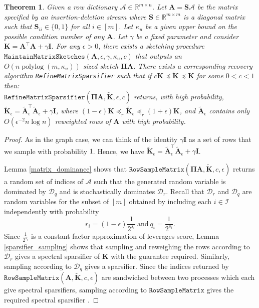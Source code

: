 \documentclass[11pt]{article}
\newcommand{\bs}[1]{\boldsymbol{#1}}
\newcommand{\bv}[1]{\mathbf{#1}}
\newcommand{\maintainma}{\texttt{MaintainMatrixSketches}}
\newcommand{\sample}{\texttt{RowSampleMatrix}}
\newcommand{\plog}{\mathop\mathrm{polylog}}
\newcommand{\R}{\mathbb{R}}
\newcommand{\mvar}[1]{\bv{#1}}
\newcommand{\ma}{\mvar{A}}
\newcommand{\mk}{\mvar{K}}
\newcommand{\ms}{\mvar{S}}
\newcommand{\dist}{\mathcal{D}}
\newtheorem{theorem}{Theorem}
\begin{document}
\begin{theorem}\label{refinement_unweighted_matrix} Given a row
dictionary $\bs{\mathcal{A}}\in\R^{m\times n}$. Let $\ma=\ms\bs{\mathcal{A}}$
be the matrix specified by an insertion-deletion stream where $\ms\in\R^{m\times m}$
is a diagonal matrix such that $\bv{S}_{ii} \in\{0,1\}$ for all $i\in[m]$. Let $\kappa_u$ be a given upper bound on the possible condition number of any $\bv{A}$.
Let $\gamma$ be a fixed parameter and consider $\bv{K}=\ma^{\top}\ma+\gamma\bv{I}$.
For any $\epsilon>0$, there exists a sketching procedure $\maintainma(\bv{A},\epsilon, \gamma, \kappa_u, c)$ that outputs an $O(n \plog (m, \kappa_u))$ sized sketch $\bv{\Pi}\bv{A}$. There exists a corresponding recovery algorithm \texttt{RefineMatrixSparsifier} such that if $c\bv{K} \preceq\bv{\tilde{K}} \preceq \bv{K}$ for some $0 < c < 1$ then:\\


$\texttt{RefineMatrixSparsifier}(\bv{\Pi}\ma,\bv{\tilde{K}},\epsilon,c)$
returns, with high probability, $\bv{\tilde{K}}_{\epsilon}=\bv{\tilde{A}}_{\epsilon}^{\top}\bv{\tilde{A}}_{\epsilon} + \gamma \bv{I}$,
where $(1-\epsilon)\bv{K}\preceq_{r}\bv{\tilde{K}}_{\epsilon}\preceq_{r}(1+\epsilon)\bv{K}$,
and $\bv{\tilde{A}}_{\epsilon}$ contains only $O(\epsilon^{-2}n\log n)$
reweighted rows of $\ma$ with high probability. \end{theorem}

\begin{proof} As in the graph case, we can think of the identity $\gamma\bv{I}$ as a set of rows that we sample with probability
$1$. Hence, we have $\bv{\tilde{K}}_{\epsilon}=\bv{\tilde{A}}_{\epsilon}^{\top}\bv{\tilde{A}}_{\epsilon}+\gamma{\bv{I}}$.

Lemma \ref{matrix_dominance} shows that $\sample(\bv{\Pi} \ma,\tilde{\mk},c,\epsilon)$
returns a random set of indices of $\bs{\mathcal{A}}$ such that the generated random variable is
dominated by $\dist_{q}$ and is stochastically dominates $\dist_{r}$. Recall that  $\dist_{r}$ and $\dist_{q}$ are random variables for the subset
of $[m]$ obtained by including each $i\in\mathcal{I}$ independently
with probability 
\[
r_{i}=(1-\epsilon)\frac{1}{2^{s_{i}}}~\text{and}~q_{i}=\frac{1}{2^{s_{i}}}.
\]
Since $\frac{1}{2^{s_{i}}}$ is a constant factor approximation of
leverages score, Lemma \ref{sparsifier_sampling} shows that sampling and reweighing the rows according
to $\dist_{r}$ gives a spectral
sparsifier of $\bv{K}$ with the guarantee required. Similarly, sampling
according to $\dist_{q}$ gives a sparsifier. Since the indices
returned by \textbf{$\sample(\ma,\tilde{\mk},c,\epsilon)$} are sandwiched
between two processes which each give spectral sparsifiers, sampling according
to $\sample$ gives
the required spectral sparsifier \cite{KP12}.
\end{proof}
\end{document}
